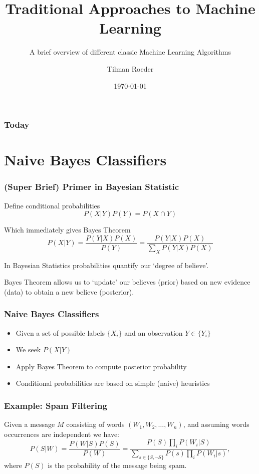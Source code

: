 \documentclass[mathserif,serif]{beamer}
\title{Traditional Approaches to Machine Learning}
\subtitle{A brief overview of different classic Machine Learning Algorithms}
\author{Tilman Roeder}
\date{\today}
\begin{document}
\begin{frame}
  \maketitle
\end{frame}

\begin{frame}
  \frametitle{Today}
  \tableofcontents
\end{frame}

\section{Naive Bayes Classifiers}
\frame{\sectionpage}

\begin{frame}
  \frametitle{(Super Brief) Primer in Bayesian Statistic}

  Define conditional probabilities
  \begin{equation}
    P(X|Y) P(Y) = P(X \cap Y)
  \end{equation}
  \pause

  Which immediately gives Bayes Theorem
  \begin{equation}
    P(X|Y) = \frac{P(Y|X) P(X)}{P(Y)} = \frac{P(Y|X) P(X)}{\sum_X P(Y|X) P(X)}
  \end{equation}
  \pause

  In Bayesian Statistics probabilities quantify our `degree of believe'.

  Bayes Theorem allows us to `update' our believes (prior) based on new
  evidence (data) to obtain a new believe (posterior).
\end{frame}

\begin{frame}
  \frametitle{Naive Bayes Classifiers}
  \begin{itemize}
    \item<1-> Given a set of possible labels $\{X_i\}$ and an observation $Y \in \{Y_i\}$
    \item<2-> We seek $P(X|Y)$
    \item<3-> Apply Bayes Theorem to compute posterior probability
    \item<4-> Conditional probabilities are based on simple (naive) heuristics
  \end{itemize}
\end{frame}

\begin{frame}
  \frametitle{Example: Spam Filtering}
  Given a message $M$ consisting of words $(W_1, W_2, \dots, W_n)$, and assuming words occurrences
  are independent we have:
  \begin{equation}
    P(S|W) = \frac{P(W|S)P(S)}{P(W)} = \frac{P(S)\prod_i P(W_i|S)}{\sum_{s \in \{S, \neg S\}} P(s) \prod_i P(W_i|s)},
  \end{equation}
  where $P(S)$ is the probability of the message being spam.
\end{frame}
\end{document}
